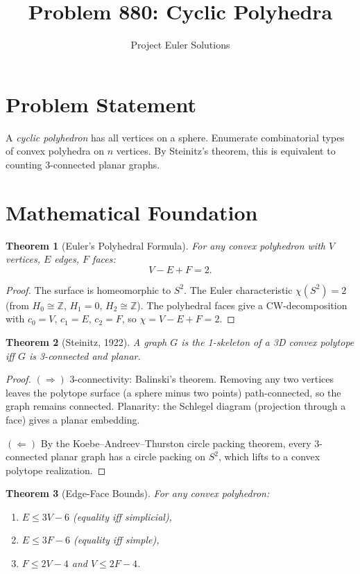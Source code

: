 \documentclass[11pt]{article}
\title{Problem 880: Cyclic Polyhedra}
\author{Project Euler Solutions}
\date{}
\newtheorem{theorem}{Theorem}
\begin{document}
\maketitle

\section{Problem Statement}

A \emph{cyclic polyhedron} has all vertices on a sphere. Enumerate combinatorial types of convex polyhedra on $n$ vertices. By Steinitz's theorem, this is equivalent to counting 3-connected planar graphs.

\section{Mathematical Foundation}

\begin{theorem}[Euler's Polyhedral Formula]
For any convex polyhedron with $V$ vertices, $E$ edges, $F$ faces:
\[
V - E + F = 2.
\]
\end{theorem}

\begin{proof}
The surface is homeomorphic to $S^2$. The Euler characteristic $\chi(S^2) = 2$ (from $H_0 \cong \mathbb{Z}$, $H_1 = 0$, $H_2 \cong \mathbb{Z}$). The polyhedral faces give a CW-decomposition with $c_0 = V$, $c_1 = E$, $c_2 = F$, so $\chi = V - E + F = 2$.
\end{proof}

\begin{theorem}[Steinitz, 1922]
A graph $G$ is the 1-skeleton of a 3D convex polytope iff $G$ is 3-connected and planar.
\end{theorem}

\begin{proof}
$(\Rightarrow)$ 3-connectivity: Balinski's theorem. Removing any two vertices leaves the polytope surface (a sphere minus two points) path-connected, so the graph remains connected. Planarity: the Schlegel diagram (projection through a face) gives a planar embedding.

$(\Leftarrow)$ By the Koebe--Andreev--Thurston circle packing theorem, every 3-connected planar graph has a circle packing on $S^2$, which lifts to a convex polytope realization.
\end{proof}

\begin{theorem}[Edge-Face Bounds]
For any convex polyhedron:
\begin{enumerate}
\item $E \le 3V - 6$ (equality iff simplicial),
\item $E \le 3F - 6$ (equality iff simple),
\item $F \le 2V - 4$ and $V \le 2F - 4$.
\end{enumerate}
\end{theorem}
\end{document}
